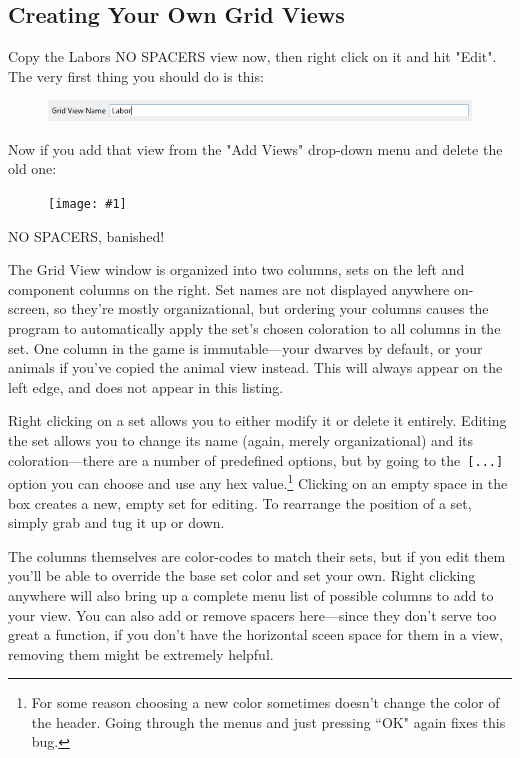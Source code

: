 \documentclass[]{article}
\newcommand{\fullfigure}[1] {
\begin{figure}[h!]
\texttt{[image: \#1]}
\end{figure}
}
\begin{document}
\newpage
\subsection{Creating Your Own Grid Views}
\label{sec:Creating Your Own Grid Views}

Copy the Labors NO SPACERS view now, then right click on it and hit "Edit". The very first thing you
should do is this:
\begin{figure}[h!]
\centering
\includegraphics[width=\linewidth]{Sec3Fig15}
\end{figure}

Now if you add that view from the "Add Views" drop-down menu and delete the old one:
\fullfigure{Sec3Fig16}

NO SPACERS, banished!

The Grid View window is organized into two columns, sets on the left and
component columns on the right. Set names are not displayed anywhere on-screen, so they're mostly
organizational, but ordering your columns causes the program to automatically apply the set's chosen
coloration to all columns in the set. One column in the game is immutable---your dwarves by default, or
your animals if you've copied the animal view instead. This will always appear on the left edge, and does
not appear in this listing.

Right clicking on a set allows you to either modify it or delete it entirely. Editing the set allows you
to change its name (again, merely organizational) and its coloration---there are a number of predefined
options, but by going to the\texttt{ [...]} option you can choose and use any hex value.\footnote{For
some reason choosing a new color sometimes doesn't change the color of the header. Going through the
menus and just pressing ``OK" again fixes this bug.} Clicking on an empty space in the box creates a new,
empty set for editing. To rearrange the position of a set, simply grab and tug it up or down.

The columns themselves are color-codes to match their sets, but if you edit them you'll be able to
override the base set color and set your own. Right clicking anywhere will also bring up a complete
menu list of possible columns to add to your view. You can also add or remove spacers here---since they
don't serve too great a function, if you don't have the horizontal sceen space for them in a view,
removing them might be extremely helpful.
\end{document}
